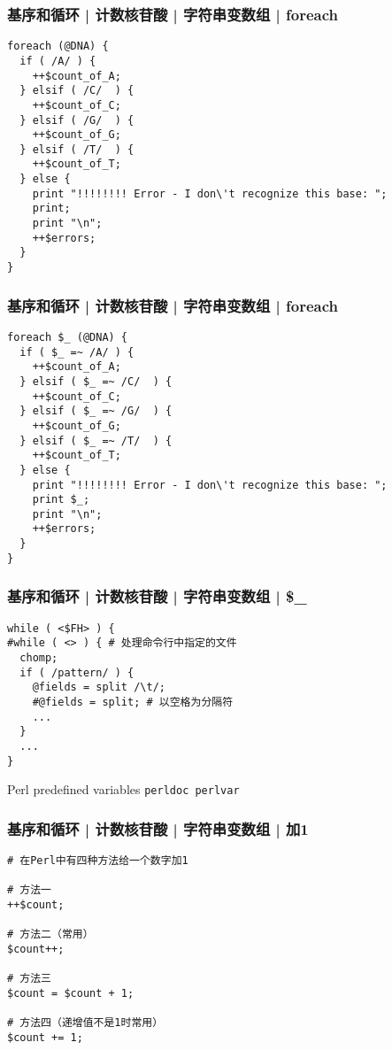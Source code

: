 \begin{frame}[fragile]
  \frametitle{基序和循环 | 计数核苷酸 | 字符串变数组 | foreach}
\begin{lstlisting}[basicstyle=\small\tt]
foreach (@DNA) {
  if ( /A/ ) {
    ++$count_of_A;
  } elsif ( /C/  ) {
    ++$count_of_C;
  } elsif ( /G/  ) {
    ++$count_of_G;
  } elsif ( /T/  ) {
    ++$count_of_T;
  } else {
    print "!!!!!!!! Error - I don\'t recognize this base: ";
    print;
    print "\n";
    ++$errors;
  }
}
\end{lstlisting}
\end{frame}

\begin{frame}[fragile]
  \frametitle{基序和循环 | 计数核苷酸 | 字符串变数组 | foreach}
\begin{lstlisting}[basicstyle=\small\tt]
foreach $_ (@DNA) {
  if ( $_ =~ /A/ ) {
    ++$count_of_A;
  } elsif ( $_ =~ /C/  ) {
    ++$count_of_C;
  } elsif ( $_ =~ /G/  ) {
    ++$count_of_G;
  } elsif ( $_ =~ /T/  ) {
    ++$count_of_T;
  } else {
    print "!!!!!!!! Error - I don\'t recognize this base: ";
    print $_;
    print "\n";
    ++$errors;
  }
}
\end{lstlisting}
\end{frame}

\begin{frame}[fragile]
  \frametitle{基序和循环 | 计数核苷酸 | 字符串变数组 | \$\_}
\begin{lstlisting}
while ( <$FH> ) {
#while ( <> ) { # 处理命令行中指定的文件
  chomp;
  if ( /pattern/ ) {
    @fields = split /\t/;
    #@fields = split; # 以空格为分隔符
    ...
  }
  ...
}
\end{lstlisting}
\pause
\begin{block}{Perl predefined variables}
  \verb|perldoc perlvar|
\end{block}
\end{frame}

\begin{frame}[fragile]
  \frametitle{基序和循环 | 计数核苷酸 | 字符串变数组 | \alert{加1}}
\begin{lstlisting}
# 在Perl中有四种方法给一个数字加1

# 方法一
++$count;

# 方法二（常用）
$count++;

# 方法三
$count = $count + 1;

# 方法四（递增值不是1时常用）
$count += 1;
\end{lstlisting}
\end{frame}

